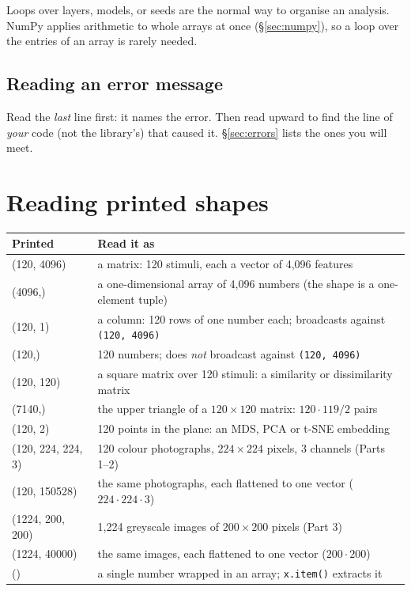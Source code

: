 \documentclass[11pt]{article}
\begin{document}
Loops over layers, models, or seeds are the normal way to organise an analysis. NumPy
applies arithmetic to whole arrays at once (\S\ref{sec:numpy}), so a loop over the entries of an
array is rarely needed.

\subsection{Reading an error message}

Read the \emph{last} line first: it names the error. Then read upward to find the line
of \emph{your} code (not the library's) that caused it. \S\ref{sec:errors} lists the ones you will meet.

\section{Reading printed shapes}\label{sec:shapes}

\begin{center}
\small
\begin{tabular}{@{}>{\ttfamily}l p{10.6cm}@{}}
\toprule
\textnormal{\textbf{Printed}} & \textbf{Read it as} \\
\midrule
(120, 4096)   & a matrix: 120 stimuli, each a vector of 4,096 features \\
(4096,)       & a one-dimensional array of 4,096 numbers (the shape is a one-element tuple) \\
(120, 1)      & a column: 120 rows of one number each; broadcasts against \texttt{(120, 4096)} \\
(120,)        & 120 numbers; does \emph{not} broadcast against \texttt{(120, 4096)} \\
(120, 120)    & a square matrix over 120 stimuli: a similarity or dissimilarity matrix \\
(7140,)       & the upper triangle of a $120 \times 120$ matrix: $120 \cdot 119 / 2$ pairs \\
(120, 2)      & 120 points in the plane: an MDS, PCA or t-SNE embedding \\
(120, 224, 224, 3) & 120 colour photographs, $224 \times 224$ pixels, 3 channels (Parts 1--2) \\
(120, 150528) & the same photographs, each flattened to one vector ($224 \cdot 224 \cdot 3$) \\
(1224, 200, 200) & 1,224 greyscale images of $200 \times 200$ pixels (Part 3) \\
(1224, 40000) & the same images, each flattened to one vector ($200 \cdot 200$) \\
()            & a single number wrapped in an array; \texttt{x.item()} extracts it \\
\bottomrule
\end{tabular}
\end{center}
\end{document}

